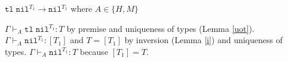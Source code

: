 \begin{case}
$\mathtt{tl}\;\mathtt{nil}^{T_{1}}\rightarrow\mathtt{nil}^{T_{1}}$ where $A\in\lbrace H,M\rbrace$

$\Gamma\vdash_{A}\mathtt{tl}\;\mathtt{nil}^{T_{1}}:T$ by premise and uniqueness of types (Lemma \ref{uot}).  $\Gamma\vdash_{A}\mathtt{nil}^{T_{1}}:[T_{1}]$ and $T=[T_{1}]$ by inversion (Lemma \ref{i}) and uniqueness of types.  $\Gamma\vdash_{A}\mathtt{nil}^{T_{1}}:T$ because $[T_{1}]=T$.
\end{case}